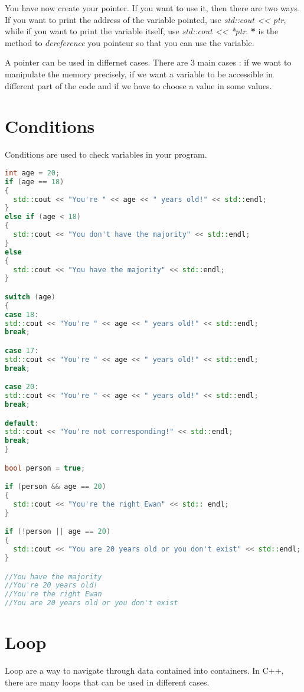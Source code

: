 \documentclass[a4paper, 12pt, titlepage]{scrartcl} %
\begin{document}
You have now create your pointer. If you want to use it, then there are two ways. If you want to print the address of the variable pointed, use \textit{std::cout << ptr}, while if you want to print the variable itself, use \textit{std::cout << *ptr}. \textbf{*} is the method to \textit{dereference} you pointeur so that you can use the variable.

\vspace{5mm}

A pointer can be used in differnet cases. There are 3 main cases : if we want to manipulate the memory precisely, if we want a variable to be accessible in different part of the code and if we have to choose a value in some values.





\newpage
\section{Conditions}
Conditions are used to check variables in your program.
\begin{lstlisting}[language=C++]
int age = 20;
if (age == 18)
{
  std::cout << "You're " << age << " years old!" << std::endl;
}
else if (age < 18)
{
  std::cout << "You don't have the majority" << std::endl;
}
else
{
  std::cout << "You have the majority" << std::endl;
}

switch (age)
{
case 18:
std::cout << "You're " << age << " years old!" << std::endl;
break;

case 17:
std::cout << "You're " << age << " years old!" << std::endl;
break;

case 20:
std::cout << "You're " << age << " years old!" << std::endl;
break;

default:
std::cout << "You're not corresponding!" << std::endl;
break;
}

bool person = true;

if (person && age == 20)
{
  std::cout << "You're the right Ewan" << std:: endl;
}

if (!person || age == 20)
{
  std::cout << "You are 20 years old or you don't exist" << std::endl;
}

//You have the majority
//You're 20 years old!
//You're the right Ewan
//You are 20 years old or you don't exist
\end{lstlisting} \vspace{5mm}

\newpage
\section{Loop}
Loop are a way to navigate through data contained into containers. In C++, there are many loops that can be used in different cases.
\end{document}
